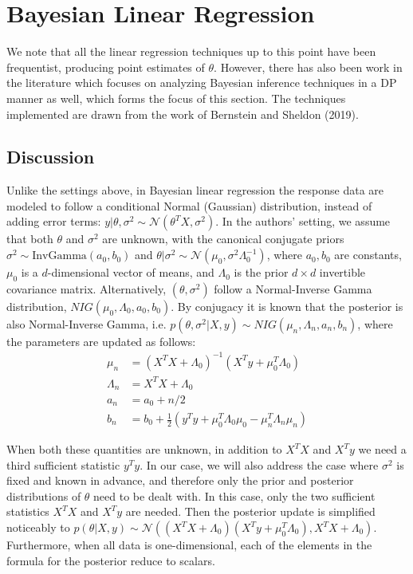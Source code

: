 \documentclass[11pt,conference]{IEEEtran}
\newcommand{\Normal}{\mathcal{N}}
\begin{document}
\section{Bayesian Linear Regression}
We note that all the linear regression techniques up to this point have been frequentist, producing point estimates of $\theta$. However, there has also been work in the literature which focuses on analyzing Bayesian inference techniques in a DP manner as well, which forms the focus of this section. The techniques implemented are drawn from the work of Bernstein and Sheldon (2019).

\subsection{Discussion} Unlike the settings above, in Bayesian linear regression the response data are modeled to follow a conditional Normal (Gaussian) distribution, instead of adding error terms: $y|\theta, \sigma^2\sim \Normal(\theta^T X, \sigma^2)$. In the authors' setting, we assume that both $\theta$ and $\sigma^2$ are unknown, with the canonical conjugate priors $\sigma^2\sim \textrm{InvGamma}(a_0,b_0)$ and $\theta|\sigma^2\sim \Normal(\mu_0,\sigma^2\Lambda_0^{-1})$, where $a_0,b_0$ are constants, $\mu_0$ is a $d$-dimensional vector of means, and $\Lambda_0$ is the prior $d\times d$ invertible covariance matrix. Alternatively, $(\theta, \sigma^2)$ follow a Normal-Inverse Gamma distribution, $NIG(\mu_0,\Lambda_0,a_0,b_0)$. By conjugacy it is known that the posterior is also Normal-Inverse Gamma, i.e. $p(\theta, \sigma^2|X,y)\sim NIG(\mu_n,\Lambda_n,a_n,b_n)$, where the parameters are updated as follows: 
\begin{align*}
    \mu_n &= (X^T X+\Lambda_0)^{-1}(X^T y+\mu_0^T \Lambda_0) \\
    \Lambda_n &= X^T X+\Lambda_0 \\
    a_n &= a_0+n/2 \\
    b_n &= b_0+\frac{1}{2}(y^T y+\mu_0^T \Lambda_0 \mu_0-\mu_n^T\Lambda_n\mu_n)
\end{align*}

When both these quantities are unknown, in addition to $X^T X$ and $X^T y$ we need a third sufficient statistic $y^T y$. In our case, we will also address the case where $\sigma^2$ is fixed and known in advance, and therefore only the prior and posterior distributions of $\theta$ need to be dealt with. In this case, only the two sufficient statistics $X^T X$ and $X^T y$ are needed. Then the posterior update is simplified noticeably to $p(\theta|X,y)\sim \Normal((X^T X+\Lambda_0)(X^T y+\mu_0^T\Lambda_0), X^T X+\Lambda_0)$. Furthermore, when all data is one-dimensional, each of the elements in the formula for the posterior reduce to scalars. 
\end{document}

